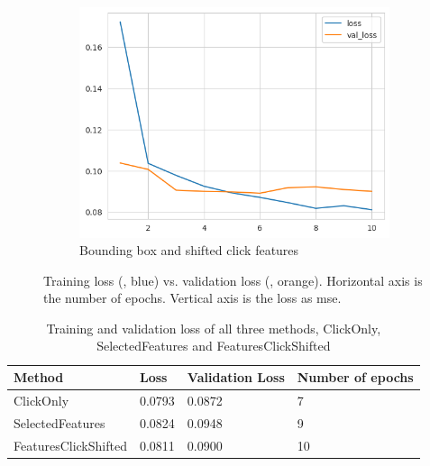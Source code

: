 \begin{figure}[htbp!]
\begin{subfigure}[b]{0.8\textwidth}
    \centering
    \includegraphics[width=\textwidth]{graphics/model_history_loss_features_shifted}
    \caption{Bounding box and shifted click features}
    \label{fig:model_history_loss_features_shifted}
  \end{subfigure}
  \caption[Training loss vs. validation loss]{Training loss (, blue) vs. validation loss (, orange). Horizontal axis is the number of epochs. Vertical axis is the loss as \gls{mse}.}
  \label{fig:model_history_losses}
\end{figure}

\begin{table}[htbp!]
  \small
  \centering
  \begin{tabular}{|l|l|l|l|}
    \hline
    \textbf{Method}      & \textbf{Loss} & \textbf{Validation Loss} & \textbf{Number of epochs} \\
    \hline
    ClickOnly            & 0.0793        & 0.0872                   & 7                         \\
    SelectedFeatures     & 0.0824        & 0.0948                   & 9                         \\
    FeaturesClickShifted & 0.0811        & 0.0900                   & 10                        \\
    \hline
  \end{tabular}
  \caption[Training and validation loss, number of epochs]{Training and validation loss of all three methods, ClickOnly, SelectedFeatures and FeaturesClickShifted}
  \label{tab:model_losses}
\end{table}

